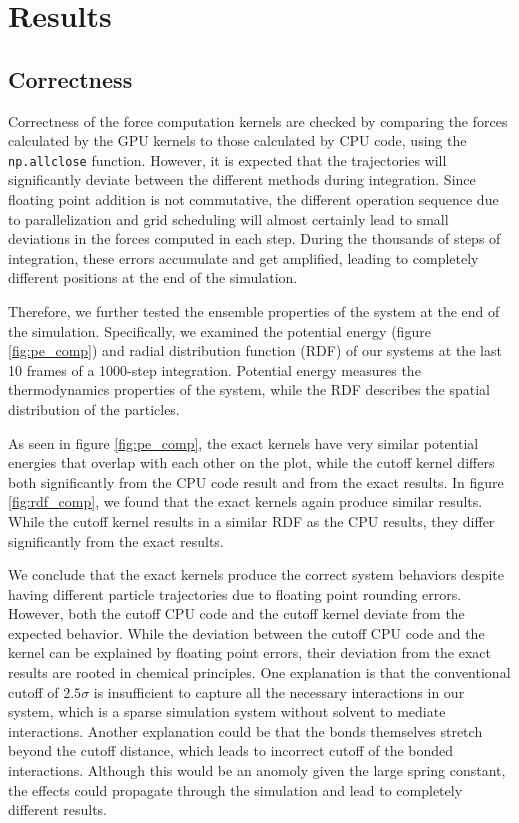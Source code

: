 \documentclass[12pt]{article}
\begin{document}
\section{Results}

\subsection{Correctness}
Correctness of the force computation kernels are checked by comparing the forces calculated by the GPU kernels to those calculated by CPU code, using the \texttt{np.allclose} function. However, it is expected that the trajectories will significantly deviate between the different methods during integration. Since floating point addition is not commutative, the different operation sequence due to parallelization and grid scheduling will almost certainly lead to small deviations in the forces computed in each step. During the thousands of steps of integration, these errors accumulate and get amplified, leading to completely different positions at the end of the simulation.

Therefore, we further tested the ensemble properties of the system at the end of the simulation. Specifically, we examined the potential energy (figure \ref{fig:pe_comp}) and radial distribution function (RDF)  of our systems at the last 10 frames of a 1000-step integration. Potential energy measures the thermodynamics properties of the system, while the RDF describes the spatial distribution of the particles.

As seen in figure \ref{fig:pe_comp}, the exact kernels have very similar potential energies that overlap with each other on the plot, while the cutoff kernel differs both significantly from the CPU code result and from the exact results. In figure \ref{fig:rdf_comp}, we found that the exact kernels again produce similar results. While the cutoff kernel results in a similar RDF as the CPU results, they differ significantly from the exact results.

We conclude that the exact kernels produce the correct system behaviors despite having different particle trajectories due to floating point rounding errors. However, both the cutoff CPU code and the cutoff kernel deviate from the expected behavior. While the deviation between the cutoff CPU code and the kernel can be explained by floating point errors, their deviation from the exact results are rooted in chemical principles. One explanation is that the conventional cutoff of $2.5\sigma$ is insufficient to capture all the necessary interactions in our system, which is a sparse simulation system without solvent to mediate interactions. Another explanation could be that the bonds themselves stretch beyond the cutoff distance, which leads to incorrect cutoff of the bonded interactions. Although this would be an anomoly given the large spring constant, the effects could propagate through the simulation and lead to completely different results.
\end{document}
